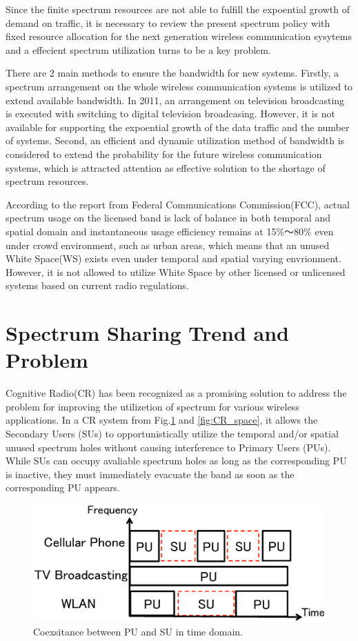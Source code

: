 Since the finite spectrum resources are not able to fulfill the expoential growth of demand on traffic, it is necessary to review the present spectrum policy with fixed resource allocation for the next generation wireless communication sysytems and a effecient spectrum utilization turns to be a key problem. 

There are 2 main methods to ensure the bandwidth for new systems. Firstly, a spectrum arrangement on the whole wireless communication systems is utilized to extend available bandwidth. In 2011, an arrangement on television broadcasting is executed with switching to digital television broadcasing. However, it is not available for supporting the expoential growth of the data traffic and the number of systems. Second, an efficient and dynamic utilization method of bandwidth is considered to extend the probability for the future wireless communication systems, which is attracted attention as effective solution to the shortage of spectrum resources. 

According to the report \cite{ref:FCC} from Federal Communications Commission(FCC), actual spectrum usage on the licensed band is lack of balance in both temporal and spatial domain and instantaneous usage efficiency remains at 15\%～80\% even under crowd environment, such as urban areas, which means that an unused White Space(WS) exists even under temporal and spatial varying envrionment. However, it is not allowed to utilize White Space by other licensed or unlicensed systems based on current radio regulations.

\section{Spectrum Sharing Trend and Problem}
Cognitive Radio(CR)\cite{ref:Haykin} has been recognized as a promising solution to address the problem for improving the utilizetion of spectrum for various wireless applications. In a CR system from Fig.\ref{fig:CR_time} and \ref{fig:CR_space}, it allows the Secondary Users (SUs) to opportunistically utilize the temporal and/or spatial unused spectrum holes without causing interference to Primary Users (PUs). While SUs can occupy avaliable spectrum holes as long as the corresponding PU is inactive, they must immediately evacuate the band as soon as the corresponding PU appears.

\begin{figure}[!htp]
\includegraphics[width=150mm,clip]{CR_time.eps}
\caption{Coexsitance between PU and SU in time domain.}
\label{fig:CR_time}
\end{figure}


